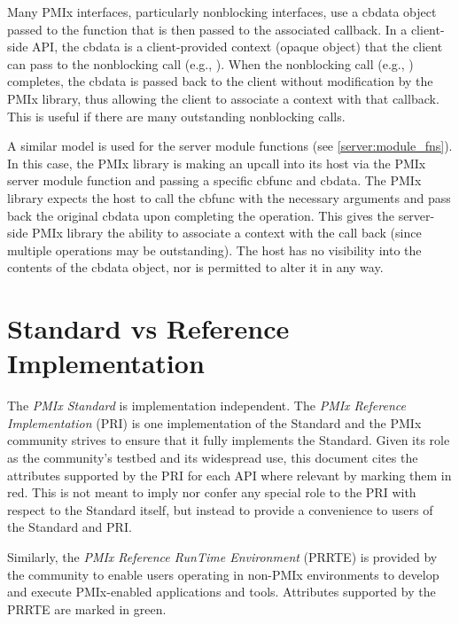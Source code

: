 Many \ac{PMIx} interfaces, particularly nonblocking interfaces, use a cbdata object passed to the function that is then passed to the associated callback. In a client-side \ac{API}, the cbdata is a client-provided context (opaque object) that the client can pass to the nonblocking call (e.g., ). When the nonblocking call (e.g., ) completes, the cbdata is passed back to the client without modification by the \ac{PMIx} library, thus allowing the client to associate a context with that callback. This is useful if there are many outstanding nonblocking calls.

A similar model is used for the server module functions (see \ref{server:module_fns}). In this case, the \ac{PMIx} library is making an upcall into its host via the \ac{PMIx} server module function and passing a specific cbfunc and cbdata. The \ac{PMIx} library expects the host to call the cbfunc with the necessary arguments and pass back the original cbdata upon completing the operation. This gives the server-side \ac{PMIx} library the ability to associate a context with the call back (since multiple operations may be outstanding). The host has no visibility into the contents of the cbdata object, nor is permitted to alter it in any way.


\section{Standard vs Reference Implementation}

The \textit{PMIx Standard} is implementation independent. The \textit{PMIx Reference Implementation} (PRI) is one implementation of the Standard and the \ac{PMIx} community strives to ensure that it fully implements the Standard. Given its role as the community's testbed and its widespread use, this document cites the attributes supported by the \ac{PRI} for each \ac{API} where relevant by marking them in {\color{red}red}. This is not meant to imply nor confer any special role to the \ac{PRI} with respect to the Standard itself, but instead to provide a convenience to users of the Standard and \ac{PRI}.

Similarly, the \textit{PMIx Reference RunTime Environment} (PRRTE) is provided by the community to enable users operating in non-\ac{PMIx} environments to develop and execute \ac{PMIx}-enabled applications and tools. Attributes supported by the \ac{PRRTE} are marked in {\color{green!60!black}green}.

